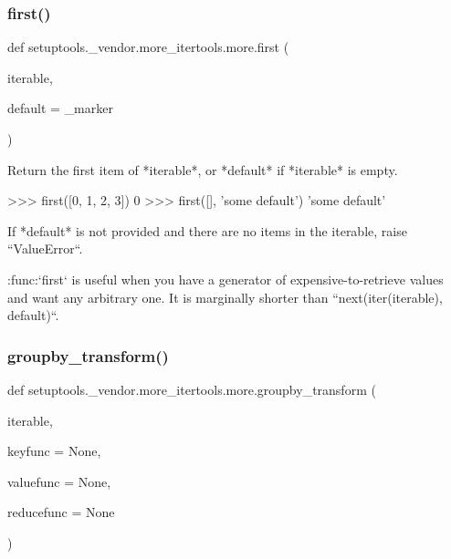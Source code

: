\subsubsection{\texorpdfstring{first()}{first()}}
{\footnotesize\ttfamily def setuptools.\+\_\+vendor.\+more\+\_\+itertools.\+more.\+first (\begin{DoxyParamCaption}\item[{}]{iterable,  }\item[{}]{default = {\ttfamily \+\_\+marker} }\end{DoxyParamCaption})}

\begin{DoxyVerb}Return the first item of *iterable*, or *default* if *iterable* is
empty.

    >>> first([0, 1, 2, 3])
    0
    >>> first([], 'some default')
    'some default'

If *default* is not provided and there are no items in the iterable,
raise ``ValueError``.

:func:`first` is useful when you have a generator of expensive-to-retrieve
values and want any arbitrary one. It is marginally shorter than
``next(iter(iterable), default)``.\end{DoxyVerb}
 \mbox{\label{namespacesetuptools_1_1__vendor_1_1more__itertools_1_1more_a9f3de1e0322f346b3b2c7f6cf6858603}} 
\subsubsection{\texorpdfstring{groupby\+\_\+transform()}{groupby\_transform()}}
{\footnotesize\ttfamily def setuptools.\+\_\+vendor.\+more\+\_\+itertools.\+more.\+groupby\+\_\+transform (\begin{DoxyParamCaption}\item[{}]{iterable,  }\item[{}]{keyfunc = {\ttfamily None},  }\item[{}]{valuefunc = {\ttfamily None},  }\item[{}]{reducefunc = {\ttfamily None} }\end{DoxyParamCaption})}

